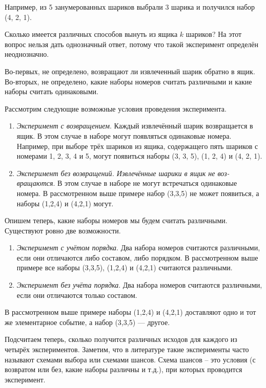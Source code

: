 Например, из 5 занумерованных шариков выбрали 3 шарика и получился
набор (4, 2, 1).

Сколько имеется различных способов вынуть из ящика $k$ шариков? На
этот вопрос нельзя дать однозначный ответ, потому что такой эксперимент
определён неоднозначно.

Во-первых, не определено, возвращают ли извлеченный шарик обратно в
ящик. Во-вторых, не определено, какие наборы номеров считать различными
и какие наборы считать одинаковыми.

Рассмотрим следующие возможные условия проведения эксперимента.
\begin{enumerate}
\item 
\textit{Эксперимент с возвращением}. 
Каждый извлечённый шарик возвращается в ящик.
В этом случае в наборе могут появляться одинаковые номера. Например, при выборе трёх шариков из ящика, содержащего пять шариков
с номерами 1, 2, 3, 4 и 5, могут появиться наборы (3, 3, 5), (1, 2, 4)
и (4, 2, 1).
\item 
\textit{Эксперимент без возвращений. Извлечённые шарики в ящик не воз-
вращаются}.
В этом случае в наборе не могут встречаться одинаковые номера. В
рассмотренном выше примере набор (3,3,5) не может появиться, а
наборы (1,2,4) и (4,2,1) могут.

\end{enumerate}

Опишем теперь, какие наборы номеров мы будем считать различными.
Существуют ровно две возможности.
\begin{enumerate}
\item 
\textit{Эксперимент с учётом порядка}. Два набора номеров считаются различными, если они отличаются либо составом, либо порядком.
В рассмотренном выше примере все наборы (3,3,5), (1,2,4) и (4,2,1)
считаются различными.
\item
\textit{Эксперимент без учёта порядка}. Два набора номеров считаются различными, если они отличаются только составом.

\end{enumerate}
В рассмотренном выше примере наборы (1,2,4) и (4,2,1) доставляют
одно и тот же элементарное событие, а набор (3,3,5) — другое.

Подсчитаем теперь, сколько получится различных исходов для каждого
из четырёх экспериментов. Заметим, что в литературе такие эксперименты
часто называют схемами выбора или схемами шансов. Схема шансов -- это
условия (с возвратом или без, какие наборы различны и т.д.), при которых
проводится эксперимент.

